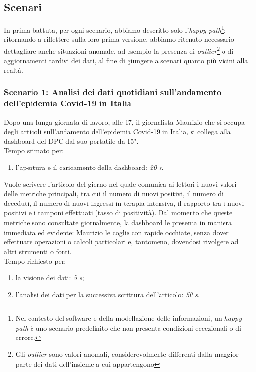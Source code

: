 \subsection{Scenari}
In prima battuta, per ogni scenario, abbiamo descritto solo l'\textit{happy path}\footnote{Nel contesto del software o della modellazione delle informazioni, un \textit{happy path} è uno scenario predefinito che non presenta condizioni eccezionali o di errore.}: ritornando a riflettere sulla loro prima versione, abbiamo ritenuto necessario dettagliare anche situazioni anomale, ad esempio la presenza di \textit{outlier}\footnote{Gli \textit{outlier} sono valori anomali, considerevolmente differenti dalla maggior parte dei dati dell'insieme a cui appartengono} o di aggiornamenti tardivi dei dati, al fine di giungere a scenari quanto più vicini alla realtà.

\subsubsection{Scenario 1: Analisi dei dati quotidiani sull'andamento dell'epidemia Covid-19 in Italia}
Dopo una lunga giornata di lavoro, alle 17, il giornalista Maurizio che si occupa degli articoli sull'andamento dell'epidemia Covid-19 in Italia, si collega alla dashboard del DPC dal suo portatile da 15".\\
Tempo stimato per:
\begin{enumerate}
    \item l'apertura e il caricamento della dashboard: \textit{20 s}.
\end{enumerate}

\noindent
Vuole scrivere l'articolo del giorno nel quale comunica ai lettori i nuovi valori delle metriche principali, tra cui il numero di nuovi positivi, il numero di deceduti, il numero di nuovi ingressi in terapia intensiva, il rapporto tra i nuovi positivi e i tamponi effettuati (tasso di positività). Dal momento che queste metriche sono consultate giornalmente, la dashboard le presenta in maniera immediata ed evidente: Maurizio le coglie con rapide occhiate, senza dover effettuare operazioni o calcoli particolari e, tantomeno, dovendosi rivolgere ad altri strumenti o fonti.\\
Tempo richiesto per:
\begin{enumerate}
    \item la visione dei dati: \textit{5 s};
    \item l'analisi dei dati per la successiva scrittura dell'articolo: \textit{50 s}.
\end{enumerate}

